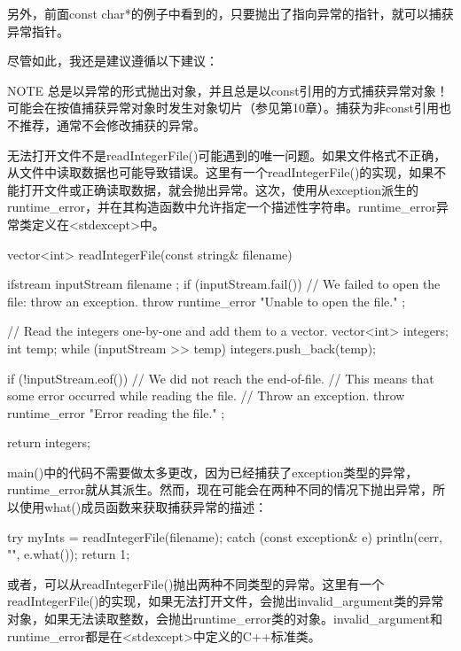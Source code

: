 另外，前面const char*的例子中看到的，只要抛出了指向异常的指针，就可以捕获异常指针。

尽管如此，我还是建议遵循以下建议：

\begin{myNotic}{NOTE}
总是以异常的形式抛出对象，并且总是以const引用的方式捕获异常对象！可能会在按值捕获异常对象时发生对象切片（参见第10章）。捕获为非const引用也不推荐，通常不会修改捕获的异常。
\end{myNotic}


无法打开文件不是readIntegerFile()可能遇到的唯一问题。如果文件格式不正确，从文件中读取数据也可能导致错误。这里有一个readIntegerFile()的实现，如果不能打开文件或正确读取数据，就会抛出异常。这次，使用从exception派生的runtime\_error，并在其构造函数中允许指定一个描述性字符串。runtime\_error异常类定义在<stdexcept>中。

\begin{cpp}
vector<int> readIntegerFile(const string& filename)
{
    ifstream inputStream { filename };
    if (inputStream.fail()) {
        // We failed to open the file: throw an exception.
        throw runtime_error { "Unable to open the file." };
    }

    // Read the integers one-by-one and add them to a vector.
    vector<int> integers;
    int temp;
    while (inputStream >> temp) {
        integers.push_back(temp);
    }

    if (!inputStream.eof()) {
        // We did not reach the end-of-file.
        // This means that some error occurred while reading the file.
        // Throw an exception.
        throw runtime_error { "Error reading the file." };
    }

    return integers;
}
\end{cpp}

main()中的代码不需要做太多更改，因为已经捕获了exception类型的异常，runtime\_error就从其派生。然而，现在可能会在两种不同的情况下抛出异常，所以使用what()成员函数来获取捕获异常的描述：

\begin{cpp}
try {
    myInts = readIntegerFile(filename);
} catch (const exception& e) {
    println(cerr, "{}", e.what());
    return 1;
}
\end{cpp}

或者，可以从readIntegerFile()抛出两种不同类型的异常。这里有一个readIntegerFile()的实现，如果无法打开文件，会抛出invalid\_argument类的异常对象，如果无法读取整数，会抛出runtime\_error类的对象。invalid\_argument和runtime\_error都是在<stdexcept>中定义的C++标准类。

